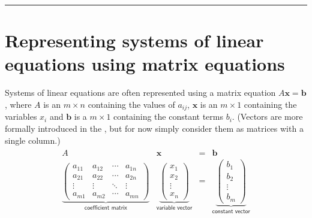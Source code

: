 \documentclass[letterpaper,10pt,english]{jupyterBook}
\begin{document}
\bigskip\hrule\bigskip


\ignorespaces 

\section{Representing systems of linear equations using matrix equations}
\label{\detokenize{_pages/2.0_Linear_systems:representing-systems-of-linear-equations-using-matrix-equations}}\label{\detokenize{_pages/2.0_Linear_systems:index-2}}
\sphinxAtStartPar
Systems of linear equations are often represented using a matrix equation \(A \mathbf{x} = \mathbf{b}\), where \(A\) is an \(m \times n\)  containing the values of \(a_{ij}\), \(\mathbf{x}\) is an \(m \times 1\)  containing the variables \(x_i\) and \(\mathbf{b}\) is a \(m \times 1\)  containing the constant terms \(b_i\). (Vectors are more formally introduced in the {\hyperref[\detokenize{_pages/3.0_Vectors:vectors-chapter}]{}}, but for now simply consider them as matrices with a single column.)
\begin{equation*}
\begin{split} \begin{array}{cccc}
    A & \mathbf{x} & = & \mathbf{b} \\[4pt]
    \underbrace{\begin{pmatrix}
        a_{11} & a_{12} & \cdots & a_{1n} \\
        a_{21} & a_{22} & \cdots & a_{2n} \\
        \vdots & \vdots & \ddots & \vdots \\
        a_{m1} & a_{m2} & \cdots & a_{mn}
    \end{pmatrix}}_{\textsf{coefficient matrix}} &
    \underbrace{\begin{pmatrix} x_1 \\ x_2 \\ \vdots \\ x_n \end{pmatrix}}_{\textsf{variable vector}} & = &
    \underbrace{\begin{pmatrix} b_1 \\ b_2 \\ \vdots \\ b_m \end{pmatrix}}_{\textsf{constant vector}}
\end{array} \end{split}
\end{equation*}
\end{document}
